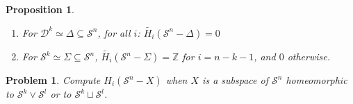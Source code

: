 \documentclass[11pt, a4paper, final]{amsart}
\newcommand{\Z}{{\mathbb{Z}}}
\newcommand{\sphere}{\mathcal{S}}
\newcommand{\disk}{\mathcal{D}}
\numberwithin{theorem}{section}
\newtheorem{proposition}[theorem]{Proposition}
\newtheorem{problem}[theorem]{Problem}
\theoremstyle{definition}
\theoremstyle{remark}
\begin{document}
\begin{proposition}\label{proposition: 2B.1, homology of sphere and disc inclusions into sphere}
    \hfill
    \begin{enumerate}
        \item For $\disk^k \simeq \Delta \subseteq \sphere^n$, for all $i$: $\tilde{H_i}(\sphere^n-\Delta) = 0$
        \item For $\sphere^k \simeq \Sigma \subseteq \sphere^n$, $\tilde{H_i}(\sphere^n - \Sigma) = \Z$ for $i = n - k - 1$, and $0$ otherwise. 
    \end{enumerate}
\end{proposition}

\begin{problem}\label{problem: 2.B.1}
    Compute $H_i(\sphere^n -X)$ when $X$ is a subspace of $\sphere^n$ homeomorphic to $\sphere^k \vee \sphere^l$ or to $\sphere^k \sqcup \sphere^l$.
\end{problem}
\end{document}
